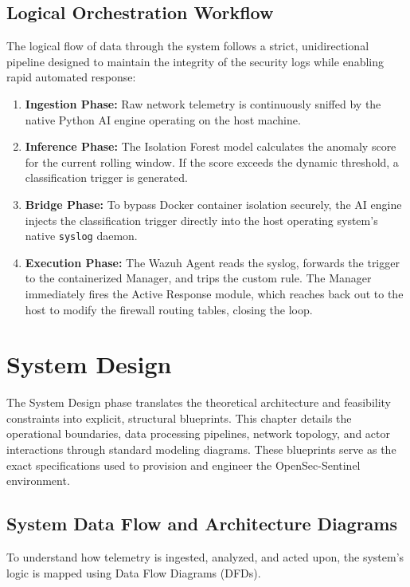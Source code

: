 \documentclass[12pt, a4paper]{report}
\begin{document}
	\section{Logical Orchestration Workflow}
	The logical flow of data through the system follows a strict, unidirectional pipeline designed to maintain the integrity of the security logs while enabling rapid automated response:
	
	
	
	\begin{enumerate}
		\item \textbf{Ingestion Phase:} Raw network telemetry is continuously sniffed by the native Python AI engine operating on the host machine.
		\item \textbf{Inference Phase:} The Isolation Forest model calculates the anomaly score for the current rolling window. If the score exceeds the dynamic threshold, a classification trigger is generated.
		\item \textbf{Bridge Phase:} To bypass Docker container isolation securely, the AI engine injects the classification trigger directly into the host operating system's native \texttt{syslog} daemon.
		\item \textbf{Execution Phase:} The Wazuh Agent reads the syslog, forwards the trigger to the containerized Manager, and trips the custom rule. The Manager immediately fires the Active Response module, which reaches back out to the host to modify the firewall routing tables, closing the loop.
	\end{enumerate}
	
	\chapter{System Design}
	\onehalfspacing
	
	The System Design phase translates the theoretical architecture and feasibility constraints into explicit, structural blueprints. This chapter details the operational boundaries, data processing pipelines, network topology, and actor interactions through standard modeling diagrams. These blueprints serve as the exact specifications used to provision and engineer the OpenSec-Sentinel environment.
	
	\section{System Data Flow and Architecture Diagrams}
	To understand how telemetry is ingested, analyzed, and acted upon, the system's logic is mapped using Data Flow Diagrams (DFDs).
	
\end{document}
